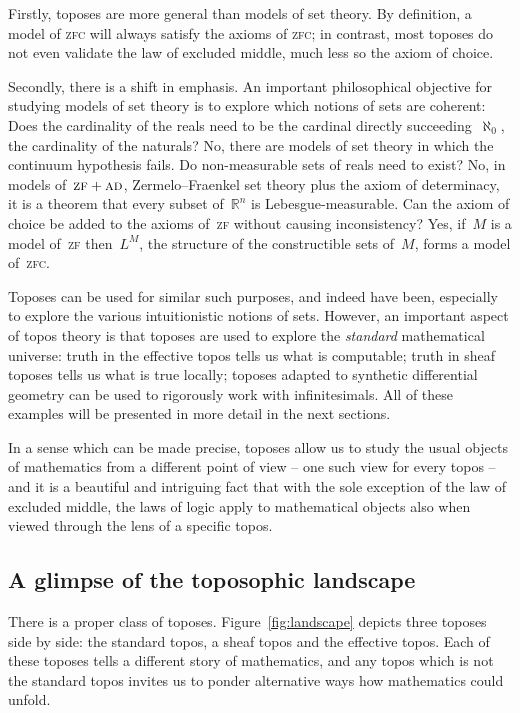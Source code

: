 \documentclass[oneside,reqno]{amsart}
\theoremstyle{definition}
\theoremstyle{plain}
\theoremstyle{remark}
\newcommand{\RR}{\mathbb{R}}
\renewcommand{\_}{\mathpunct{.}\,}
\newcommand{\effective}{ef{}fective\xspace}
\newcommand{\?}{\,{:}\,}
\begin{document}
Firstly, toposes are more general than models of set theory. By definition, a
model of \textsc{zfc} will always satisfy the axioms of \textsc{zfc}; in
contrast, most toposes do not even validate the law of excluded middle, much
less so the axiom of choice.

Secondly, there is a shift in emphasis. An important philosophical objective
for studying models of set theory is to explore which notions of sets are
coherent: Does the cardinality of the reals need to be the cardinal directly
succeeding~$\aleph_0$, the cardinality of the naturals? No, there are models of
set theory in which the continuum hypothesis fails. Do non-measurable sets of
reals need to exist? No, in models of~$\textsc{zf}+\textsc{ad}$,
Zermelo--Fraenkel set theory plus the axiom of determinacy, it is a theorem that
every subset of~$\RR^n$ is Lebesgue-measurable. Can the axiom of choice be
added to the axioms of~\textsc{zf} without causing inconsistency? Yes, if~$M$
is a model of~\textsc{zf} then~$L^M$, the structure of the constructible sets of~$M$, forms a
model of~\textsc{zfc}.

Toposes can be used for similar such purposes, and indeed have been,
especially to explore the various intuitionistic notions of sets. However, an important
aspect of topos theory is that toposes are used to explore the \emph{standard}
mathematical universe: truth in the \effective topos tells us what is
computable; truth in sheaf toposes tells us what is true locally; toposes
adapted to synthetic differential geometry can be used to rigorously work with
infinitesimals. All of these examples will be presented in more detail in the
next sections.

In a sense which can be made precise, toposes allow us to study the usual
objects of mathematics from a different point of view -- one such view for
every topos -- and it is a beautiful and intriguing fact that with the sole
exception of the law of excluded middle, the laws of logic apply to
mathematical objects also when viewed through the lens of a specific topos.


\subsection{A glimpse of the toposophic landscape}
There is a proper class of toposes. Figure~\ref{fig:landscape} depicts three
toposes side by side: the standard topos, a sheaf topos and the \effective
topos. Each of these toposes tells a different story of mathematics, and any
topos which is not the standard topos invites us to ponder alternative ways how
mathematics could unfold.
\end{document}
